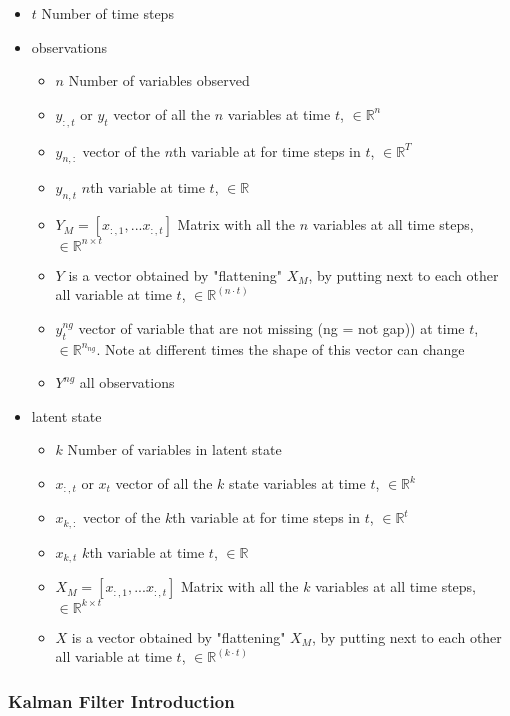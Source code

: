\documentclass{article}
\begin{document}
\begin{itemize}
\item $t$  Number of time steps
\item observations
\begin{itemize}
    \item $n$  Number of variables observed
    \item $y_{:,t}$ or $y_t$ vector of all the $n$ variables at time $t$, $\in \mathbb{R}^n $
    \item $y_{n,:}$ vector of the $n$th variable at for time steps in $t$, $\in \mathbb{R}^T$
    \item $y_{n,t}$ $n$th variable at time $t$, $\in \mathbb{R}$ 
    \item $Y_M = [x_{:,1}, ... x_{:, t}]$ Matrix with all the $n$ variables at all time steps, $\in \mathbb{R}^{n \times t}$ 
    \item $Y$ is a vector obtained by "flattening" $X_M$, by putting next to each other all variable at time $t$, $\in \mathbb{R}^{(n \cdot t)}$
    \item $y^{ng}_t$ vector of variable that are not missing (ng = not gap)) at time $t$, $\in \mathbb{R}^{n_{ng}}$. Note at different times the shape of this vector can change
    \item $Y^{ng}$ all observations
\end{itemize}

\item latent state
\begin{itemize}
    \item $k$  Number of variables in latent state
    \item $x_{:,t}$ or $x_t$ vector of all the $k$ state variables at time $t$, $\in \mathbb{R}^k $
    \item $x_{k,:}$ vector of the $k$th variable at for time steps in $t$, $\in \mathbb{R}^t$
    \item $x_{k,t}$ $k$th variable at time $t$, $\in \mathbb{R}$ 
    \item $X_M = [x_{:,1}, ... x_{:, t}]$ Matrix with all the $k$ variables at all time steps, $\in \mathbb{R}^{k \times t}$ 
    \item $X$ is a vector obtained by "flattening" $X_M$, by putting next to each other all variable at time $t$, $\in \mathbb{R}^{(k \cdot t)}$
\end{itemize}

\end{itemize}


\subsubsection{Kalman Filter Introduction}
\end{document}

